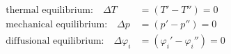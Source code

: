 \documentclass[preview]{standalone}
\begin{document}
\begin{align*}
\text{thermal equilibrium:} \quad \Delta T &= (T' - T'') = 0\\
\text{mechanical equilibrium:}\quad \Delta p &= (p' - p'') = 0\\
\text{diffusional equilibrium:} \quad \Delta \varphi_i &= (\varphi_i' - \varphi_i'') = 0
\end{align*}
\end{document}
